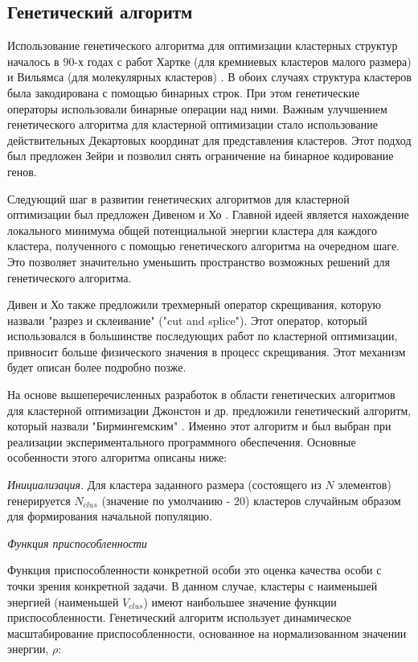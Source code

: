 \subsection{Генетический алгоритм}
\label{sec:1c}

Использование генетического алгоритма для оптимизации кластерных структур
началось в 90-х годах с работ Хартке (для кремниевых кластеров малого размера)
\cite{Hartke1993} и Вильямса (для молекулярных кластеров) \cite{Xiao1993}. В обоих
случаях структура кластеров была закодирована с помощью бинарных строк. При этом
генетические операторы использовали бинарные операции над ними. Важным улучшением
генетического алгоритма для кластерной оптимизации стало использование действительных
Декартовых координат для представления кластеров. Этот подход был предложен
Зейри \cite{Zeiri1995} и позволил снять ограничение на бинарное кодирование генов.

Следующий шаг в развитии генетических алгоритмов для кластерной оптимизации был
предложен Дивеном и Хо \cite{Deaven1995}. Главной идеей является нахождение локального
минимума общей потенциальной энергии кластера для каждого кластера, полученного
с помощью генетического алгоритма на очередном шаге. Это позволяет значительно
уменьшить пространство возможных решений для генетического алгоритма.

Дивен и Хо также предложили трехмерный оператор скрещивания, которую назвали
"разрез и склеивание" ("cut and splice"). Этот оператор, который использовался
в большинстве последующих работ по кластерной оптимизации, привносит больше 
физического значения в процесс скрещивания. Этот механизм будет описан более
подробно позже.

На основе вышеперечисленных разработок в области генетических алгоритмов для
кластерной оптимизации Джонстон и др. предложили генетический алгоритм,
который назвали "Бирмингемским" \cite{Johnston2002}. Именно этот алгоритм и был
выбран при реализации экспериментального программного обеспечения.
Основные особенности этого алгоритма описаны ниже:

{\it Инициализация}.  %
Для кластера заданного размера (состоящего из $N$ элементов) генерируется $N_{clus}$
(значение по умолчанию - 20) кластеров случайным образом для формирования начальной
популяцию.

{\it Функция приспособленности}

Функция приспособленности конкретной особи это оценка качества особи с точки зрения
конкретной задачи. В данном случае, кластеры с наименьшей энергией (наименьшей $V_{clus}$)
имеют наибольшее значение функции приспособленности. Генетический алгоритм использует
динамическое масштабирование приспособленности, основанное на нормализованном значении
энергии, $\rho$:

